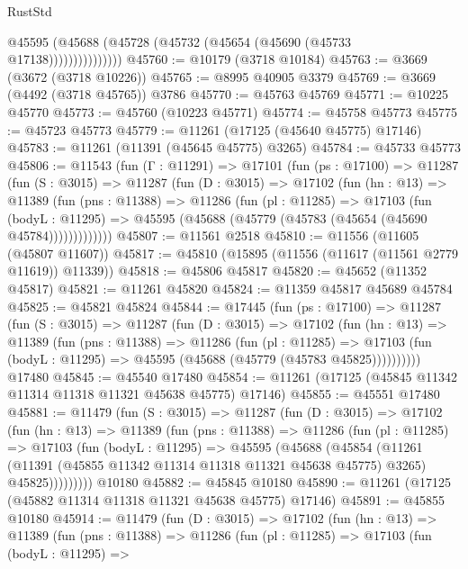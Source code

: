 \begin{lexlean}{RustStd}
\begin{coremodule}
                    @45595 (@45688 (@45728 (@45732 (@45654 (@45690 (@45733 @17138)))))))))))))))
@45760 := @10179 (@3718 @10184)
@45763 := @3669 (@3672 (@3718 @10226))
@45765 := @8995 @40905 @3379
@45769 := @3669 (@4492 (@3718 @45765)) @3786
@45770 := @45763 @45769
@45771 := @10225 @45770
@45773 := @45760 (@10223 @45771)
@45774 := @45758 @45773
@45775 := @45723 @45773
@45779 := @11261 (@17125 (@45640 @45775) @17146)
@45783 := @11261 (@11391 (@45645 @45775) @3265)
@45784 := @45733 @45773
@45806 := @11543
    (fun (Γ : @11291) =>
    @17101
      (fun (ps : @17100) =>
      @11287
        (fun (S : @3015) =>
        @11287
          (fun (D : @3015) =>
          @17102
            (fun (hn : @13) =>
            @11389
              (fun (pns : @11388) =>
              @11286
                (fun (pl : @11285) =>
                @17103
                  (fun (bodyL : @11295) =>
                  @45595 (@45688 (@45779 (@45783 (@45654 (@45690 @45784)))))))))))))
@45807 := @11561 @2518
@45810 := @11556 (@11605 (@45807 @11607))
@45817 := @45810 (@15895 (@11556 (@11617 (@11561 @2779 @11619)) @11339))
@45818 := @45806 @45817
@45820 := @45652 (@11352 @45817)
@45821 := @11261 @45820
@45824 := @11359 @45817 @45689 @45784
@45825 := @45821 @45824
@45844 := @17445
    (fun (ps : @17100) =>
    @11287
      (fun (S : @3015) =>
      @11287
        (fun (D : @3015) =>
        @17102
          (fun (hn : @13) =>
          @11389
            (fun (pns : @11388) =>
            @11286
              (fun (pl : @11285) =>
              @17103 (fun (bodyL : @11295) => @45595 (@45688 (@45779 (@45783 @45825))))))))))
    @17480
@45845 := @45540 @17480
@45854 := @11261 (@17125 (@45845 @11342 @11314 @11318 @11321 @45638 @45775) @17146)
@45855 := @45551 @17480
@45881 := @11479
    (fun (S : @3015) =>
    @11287
      (fun (D : @3015) =>
      @17102
        (fun (hn : @13) =>
        @11389
          (fun (pns : @11388) =>
          @11286
            (fun (pl : @11285) =>
            @17103
              (fun (bodyL : @11295) =>
              @45595
                (@45688
                  (@45854
                    (@11261
                      (@11391 (@45855 @11342 @11314 @11318 @11321 @45638 @45775) @3265)
                      @45825)))))))))
    @10180
@45882 := @45845 @10180
@45890 := @11261 (@17125 (@45882 @11314 @11318 @11321 @45638 @45775) @17146)
@45891 := @45855 @10180
@45914 := @11479
    (fun (D : @3015) =>
    @17102
      (fun (hn : @13) =>
      @11389
        (fun (pns : @11388) =>
        @11286
          (fun (pl : @11285) =>
          @17103
            (fun (bodyL : @11295) =>

\end{coremodule}
\end{lexlean}
